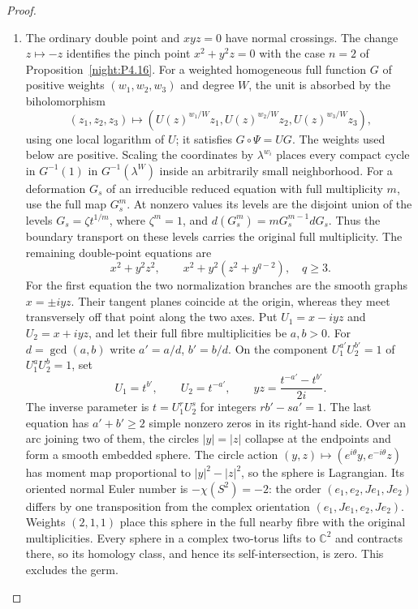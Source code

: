 \begin{proof}
\begin{enumerate}[label={$\langle1\rangle$\arabic*.},leftmargin=*]
\item The ordinary double point and $xyz=0$ have normal crossings.
The change $z\mapsto-z$ identifies the pinch point $x^2+y^2z=0$
with the case $n=2$ of Proposition~\ref{night:P4.16}.
For a weighted homogeneous full function $G$ of positive weights
$(w_1,w_2,w_3)$ and degree $W$, the unit is absorbed by the
biholomorphism
\[
 (z_1,z_2,z_3)\longmapsto
 (U(z)^{w_1/W}z_1,U(z)^{w_2/W}z_2,U(z)^{w_3/W}z_3),
\]
using one local logarithm of $U$; it satisfies $G\circ\Psi=UG$.
The weights used below are positive. Scaling the coordinates by
$\lambda^{w_i}$ places every compact cycle in $G^{-1}(1)$ in
$G^{-1}(\lambda^W)$ inside an arbitrarily small neighborhood.
For a deformation $G_s$ of an irreducible reduced equation with full
multiplicity $m$, use the full map $G_s^m$. At nonzero values its
levels are the disjoint union of the levels $G_s=\zeta t^{1/m}$,
where $\zeta^m=1$, and
$d(G_s^m)=mG_s^{m-1}dG_s$. Thus the boundary transport on these
levels carries the original full multiplicity.
The remaining double-point equations are
\[
 x^2+y^2z^2,\qquad
 x^2+y^2(z^2+y^{q-2}),\quad q\ge3.
\]
For the first equation the two normalization
branches are the smooth graphs $x=\pm i yz$.
Their tangent planes coincide at the origin,
whereas they meet transversely off that point
along the two axes. Put $U_1=x-iyz$ and $U_2=x+iyz$, and let their full fibre
multiplicities be $a,b>0$. For $d=\gcd(a,b)$ write
$a'=a/d$, $b'=b/d$. On the component $U_1^{a'}U_2^{b'}=1$
of $U_1^aU_2^b=1$, set
\[
 U_1=t^{b'},\qquad U_2=t^{-a'},\qquad
 yz=\frac{t^{-a'}-t^{b'}}{2i}.
\]
The inverse parameter is $t=U_1^rU_2^s$ for integers
$rb'-sa'=1$. The last equation has $a'+b'\ge2$ simple nonzero
zeros in its right-hand side. Over an arc joining two of them,
the circles $|y|=|z|$ collapse at the endpoints and form a smooth
embedded sphere. The circle action $(y,z)\mapsto(e^{i\theta}y,
e^{-i\theta}z)$ has moment map proportional to $|y|^2-|z|^2$,
so the sphere is Lagrangian. Its oriented normal Euler number is
$-\chi(S^2)=-2$: the order $(e_1,e_2,Je_1,Je_2)$ differs by one
transposition from the complex orientation $(e_1,Je_1,e_2,Je_2)$.
Weights $(2,1,1)$ place this sphere in the full nearby fibre with
the original multiplicities. Every sphere in a complex two-torus
lifts to $\mathbb C^2$ and contracts there, so its homology class,
and hence its self-intersection, is zero. This excludes the germ.


\end{enumerate}
\end{proof}
